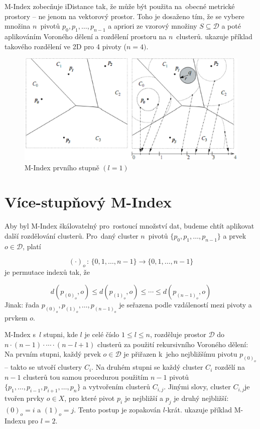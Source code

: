 M-Index zobecňuje iDistance tak, že může být použita na~obecné metrické
prostory -- ne jenom na vektorový prostor\@. Toho je dosaženo tím,
že se vybere množina $n$~pivotů $p_{0},p_{1},\ldots,p_{n-1}$ a
apriori ze vzorový množiny $S\subseteq\mathcal{D}$ a poté aplikováním
Voroného dělení a rozdělení prostoru na $n$~clusterů.  ukazuje
příklad takového rozdělení ve 2D pro 4 pivoty ($n=4)$.

\begin{figure}[t]
\begin{centering}
\includegraphics[scale=0.5]{m-index-level-one}\caption{M-Index prvního stupně $(l=1)$\label{fig:M-Index-level-one}}

\par\end{centering}

\end{figure}



\section{Více-stupňový M-Index}

Aby byl M-Index škálovatelný pro~rostoucí množství dat, budeme chtít
aplikovat další rozdělování clusterů. Pro~daný cluster $n$~pivotů
$\{p_{0},p_{1},\ldots,p_{n-1}\}$ a prvek $o\in\mathcal{D}$, platí

\[
(\cdot)_{o}\,:\,\{0,1,\ldots,n-1\}\rightarrow\{0,1,\ldots,n-1\}
\]
je permutace indexů tak, že

\[
d(p_{(0)_{o}},o)\leq d(p_{(1)_{o}},o)\leq\cdots\leq d(p_{(n-1)_{o}},o)
\]
Jinak: řada $p_{(0)_{o}},p_{(1)_{o}},\ldots,p_{(n-1)_{o}}$ je seřazena
podle vzdáleností mezi pivoty a prvkem $o$\@.

M-Index s~$l$ stupni, kde $l$ je celé číslo $1\leq l\leq n$, rozděluje
prostor $\mathcal{D}$ do $n\cdot(n-1)\cdot\cdots\cdot(n-l+1)$ clusterů
za použití rekursivního Voroného dělení: Na prvním stupni, každý
prvek $o\in\mathcal{D}$ je přiřazen k~jeho nejbližšímu pivotu $p_{(0)_{o}}$--
takto se utvoří clustery $C_{i}$\@. Na druhém stupni se každý cluster
$C_{i}$ rozdělí na $n-1$ clusterů tou samou procedurou použitím
$n-1$ pivotů $\{p_{1},\ldots,p_{i-1},p_{i+1},\ldots,p_{n}\}$ a vytvořením
clusterů $C_{i,j}$\@. Jinými slovy, cluster $C_{i,j}$je tvořen
prvky $o\in X$, pro které pivot $p_{i}$ je nejbližší a $p_{j}$
je druhý nejbližší: $(0)_{o}=i$ a $(1)_{o}=j$\@. Tento postup je
zopakován $l$-krát\@.  ukazuje
příklad M-Indexu pro $l=2$\@.

